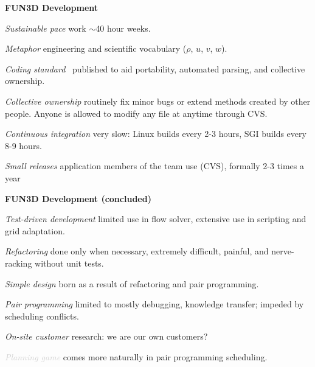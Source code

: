 \documentclass[landscape]{slides}
\renewcommand{\title}[1]{{\large\bfseries #1}}
\newenvironment{itemiz}%
  {\begin{list}{}{\raggedright
      \setlength{\itemsep}{2pt}%
      \setlength{\parskip}{4pt}\setlength{\parsep}{2pt}}}%
  {\end{list}}%
\begin{document}
 \begin{slide}
  \title{FUN3D Development}
  \begin{itemiz}
    \item[\textit{Sustainable pace}]
      {\small work $\sim$40 hour weeks.}
    \item[\textit{Metaphor}]
      {\small engineering and scientific vocabulary ($\rho$, $u$, $v$, $w$).}
    \item[\textit{Coding standard}]
      {\small\ published to aid portability, automated parsing,
               and collective ownership.}
    \item[\textit{Collective ownership}]
      {\small routinely fix minor bugs or extend methods created 
	by other people. Anyone is allowed to modify any file at 
	anytime through CVS.}
    \item[\textit{Continuous integration}]
      {\small very slow: Linux builds every 2-3 hours, 
	SGI builds every 8-9 hours.}
    \item[\textcolor{mediumGray}{\textit{Small releases}}]
      {\small application members of the team use (CVS), 
              formally 2-3 times a year}
   \end{itemiz}
 \end{slide}
  
 \begin{slide}
  \title{FUN3D Development \small(concluded)}
  \begin{itemiz}
    \item[\textcolor{mediumGray}{\textit{Test-driven development}}]
      {\small limited use in flow solver, 
	extensive use in scripting and grid adaptation.}
    \item[\textcolor{mediumGray}{\textit{Refactoring}}]
      {\small done only when necessary, extremely difficult, 
	painful, and nerve-racking without unit tests.}
    \item[\textcolor{mediumGray}{\textit{Simple design}}]
      {\small born as a result of refactoring and pair programming.}
    \item[\textcolor{mediumGray}{\textit{Pair programming}}]
      {\small limited to mostly debugging, knowledge transfer; 
	impeded by scheduling conflicts. }
    \item[\textcolor{mediumGray}{\textit{On-site customer}}]
      {\small research: we are our own customers?}  
    \item[\textcolor{lightGray}{\textit{Planning game}}]
      {\small comes more naturally in pair programming scheduling. }
  \end{itemiz}
 \end{slide}
\end{document}

